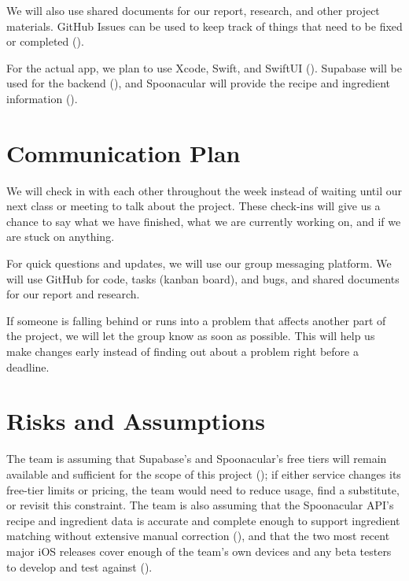 We will also use shared documents for our report, research, and other project materials. GitHub Issues can be used to keep track of things that need to be fixed or completed ().

For the actual app, we plan to use Xcode, Swift, and SwiftUI (). Supabase will be used for the backend (), and Spoonacular will provide the recipe and ingredient information ().

\section{Communication Plan}
We will check in with each other throughout the week instead of waiting until our next class or meeting to talk about the project. These check-ins will give us a chance to say what we have finished, what we are currently working on, and if we are stuck on anything.

For quick questions and updates, we will use our group messaging platform. We will use GitHub for code, tasks (kanban board), and bugs, and shared documents for our report and research.

If someone is falling behind or runs into a problem that affects another part of the project, we will let the group know as soon as possible. This will help us make changes early instead of finding out about a problem right before a deadline.

\section{Risks and Assumptions}
The team is assuming that Supabase's and Spoonacular's free tiers will remain available and sufficient for the scope of this project (); if either service changes its free-tier limits or pricing, the team would need to reduce usage, find a substitute, or revisit this constraint. The team is also assuming that the Spoonacular API's recipe and ingredient data is accurate and complete enough to support ingredient matching without extensive manual correction (), and that the two most recent major iOS releases cover enough of the team's own devices and any beta testers to develop and test against ().

